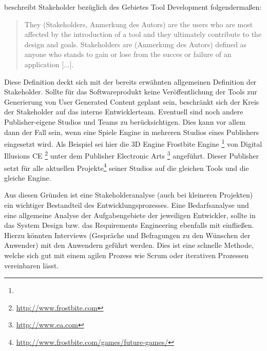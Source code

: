 \documentclass[pagesize, paper=a4, fontsize=12pt, titlepage=true, headings=small, headnosepline, abstractoff, liststotoc, nochapterprefix, plainheadsepline, twoside]{scrreprt}
\begin{document}
\autocite{Wihlidal2006} beschreibt Stakeholder bezüglich des Gebietes Tool Development folgendermaßen:
\begin{quote}
\glqq They (Stakeholders, Anmerkung des Autors) are the users who are most affected by the introduction of a tool and they ultimately contribute to the design and goals. Stakeholders are (Anmerkung des Autors) defined as anyone who stands to gain or lose from the succes or failure of an application [...].\grqq{} \parencite[S. 4-5]{Wihlidal2006}
\end{quote}
Diese Definition deckt sich mit der bereits erwähnten allgemeinen Definition der Stakeholder. Sollte für das Softwareprodukt keine Veröffentlichung der Tools zur Generierung von User Generated Content geplant sein, beschränkt sich der Kreis der Stakeholder auf das interne Entwicklerteam. Eventuell sind noch andere Publisher-eigene Studios und Teams zu berücksichtigen. Dies kann vor allem dann der Fall sein, wenn eine Spiele Engine in mehreren Studios eines Publishers eingesetzt wird. Als Beispiel sei hier die 3D Engine Frostbite Engine \footnote{} von Digital Illusions CE \footnote{\url{http://www.frostbite.com}} unter dem Publisher Electronic Arts \footnote{\url{http://www.ea.com}} angeführt. Dieser Publisher setzt für alle aktuellen Projekte\footnote{\url{http://www.frostbite.com/games/future-games/}} seiner Studios auf die gleichen Tools und die gleiche Engine.

Aus diesen Gründen ist eine Stakeholderanalyse (auch bei kleineren Projekten) ein wichtiger Bestandteil des Entwicklungsprozesses. Eine Bedarfsanalyse und eine allgemeine Analyse der Aufgabengebiete der jeweiligen Entwickler, sollte in das System Design bzw. das Requirements Engineering ebenfalls mit einfließen. Hierzu könnten Interviews (Gespräche und Befragungen zu den Wünschen der Anwender) mit den Anwendern geführt werden. Dies ist eine schnelle Methode, welche sich gut mit einem agilen Prozess wie Scrum oder iterativen Prozessen vereinbaren lässt.
\end{document}
